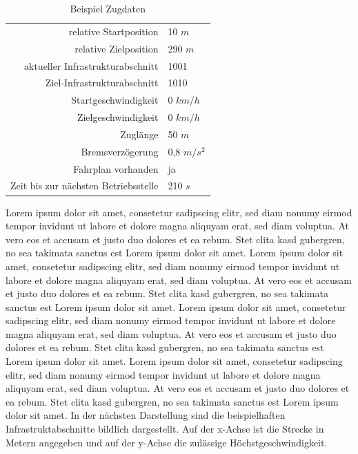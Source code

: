 \begin{table}[]
\begin{center}
\renewcommand{\arraystretch}{1.2}
\begin{tabular}[h]{r L{3cm}}

relative Startposition                   &   10 $m$                         \\ 
relative Zielposition                  &    290 $m$                         \\ 
aktueller Infrastrukturabschnitt                   &   1001                         \\ 
Ziel-Infrastrukturabschnitt                  &    1010                         \\ 
Startgeschwindigkeit                   &   0 $km/h$                          \\ 
Zielgeschwindigkeit                   &    0 $km/h$                        \\ 
Zuglänge                   &    50 $m$                        \\ 
Bremsverzögerung                   &    0,8 $m/s^{2}$                        \\ 
Fahrplan vorhanden                   &    ja                        \\ 
Zeit bis zur nächsten Betriebsstelle                   &    210 $s$                        \\ 

\end{tabular}
\renewcommand{\arraystretch}{1}
\caption{Beispiel Zugdaten}
\end{center}
\end{table}
Lorem ipsum dolor sit amet, consetetur sadipscing elitr, sed diam nonumy eirmod tempor invidunt ut labore et dolore magna aliquyam erat, sed diam voluptua. At vero eos et accusam et justo duo dolores et ea rebum. Stet clita kasd gubergren, no sea takimata sanctus est Lorem ipsum dolor sit amet. Lorem ipsum dolor sit amet, consetetur sadipscing elitr, sed diam nonumy eirmod tempor invidunt ut labore et dolore magna aliquyam erat, sed diam voluptua. At vero eos et accusam et justo duo dolores et ea rebum. Stet clita kasd gubergren, no sea takimata sanctus est Lorem ipsum dolor sit amet. Lorem ipsum dolor sit amet, consetetur sadipscing elitr, sed diam nonumy eirmod tempor invidunt ut labore et dolore magna aliquyam erat, sed diam voluptua. At vero eos et accusam et justo duo dolores et ea rebum. Stet clita kasd gubergren, no sea takimata sanctus est Lorem ipsum dolor sit amet. Lorem ipsum dolor sit amet, consetetur sadipscing elitr, sed diam nonumy eirmod tempor invidunt ut labore et dolore magna aliquyam erat, sed diam voluptua. At vero eos et accusam et justo duo dolores et ea rebum. Stet clita kasd gubergren, no sea takimata sanctus est Lorem ipsum dolor sit amet. In der nächsten Darstellung sind die beispielhaften Infrastruktabschnitte bildlich dargestellt. Auf der x-Achse ist die Strecke in Metern angegeben und auf der y-Achse die zulässige Höchstgeschwindigkeit.
